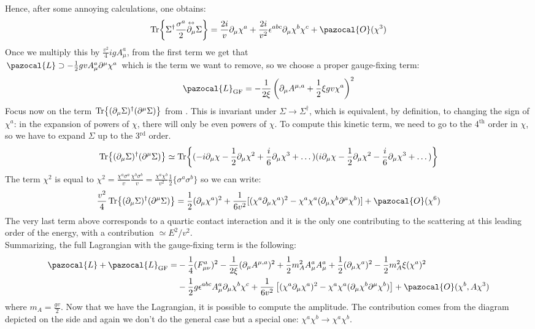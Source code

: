 \documentclass[../main.tex]{subfiles}
\begin{document}
Hence, after some annoying calculations, one obtains:
\[
\Tr{\Sigma^\dagger\frac{\sigma^a}{2}\overset{\leftrightarrow}{\partial_\mu}\Sigma}=\frac{2i}{v}\partial_\mu\chi^a+\frac{2i}{v^2}\epsilon^{abc}\partial_\mu\chi^b\chi^c+\pazocal{O}(\chi^3)
\]
Once we multiply this by $\frac{v^2}{4}igA_\mu^a$, from the first term we get that\\
$\pazocal{L}\supset-\frac{1}{2}gvA_\mu^a\partial^\mu\chi^a$ which is the term we want to remove, so we choose a proper gauge-fixing term:
\[
\pazocal{L}_{\text{GF}}=-\frac{1}{2\xi}\left(\partial_\mu A^{\mu,a}+\frac{1}{2}\xi gv\chi^a\right)^2
\]
Focus now on the term $\Tr{(\partial_\mu\Sigma)^\dagger(\partial^\mu\Sigma)}$ from . This is invariant under $\Sigma\to\Sigma^\dagger$, which is equivalent, by definition, to changing the sign of $\chi^a$: in the expansion of powers of $\chi$, there will only be even powers of $\chi$. To compute this kinetic term, we need to go to the 4$^\text{th}$ order in $\chi$, so we have to expand $\Sigma$ up to the 3$^\text{rd}$ order.
\[
\Tr{(\partial_\mu\Sigma)^\dagger(\partial^\mu\Sigma)}\simeq\Tr{(-i\partial_\mu\chi-\frac{1}{2}\partial_\mu\chi^2+\frac{i}{6}\partial_\mu\chi^3+\dots)(i\partial_\mu\chi-\frac{1}{2}\partial_\mu\chi^2-\frac{i}{6}\partial_\mu\chi^3+\dots)}
\]
The term $\chi^2$ is equal to $\chi^2=\frac{\chi^a\sigma^a}{v}\frac{\chi^b\sigma^b}{v}=\frac{\chi^a\chi^b}{v^2}\frac{1}{2}\{\sigma^a\sigma^b\}$ so we can write:
\[
\frac{v^2}{4}\Tr{(\partial_\mu\Sigma)^\dagger(\partial^\mu\Sigma)}=\frac{1}{2}(\partial_\mu\chi^a)^2+\frac{1}{6v^2}[(\chi^a\partial_\mu\chi^a)^2-\chi^a\chi^a(\partial_\mu\chi^b\partial^\mu\chi^b)]+\pazocal{O}(\chi^6)
\]
The very last term above corresponds to a quartic contact interaction and it is the only one contributing to the scattering at this leading order of the energy, with a contribution $\simeq E^2/v^2$.\\
Summarizing, the full Lagrangian with the gauge-fixing term is the following:
\begin{align*}
\pazocal{L}+\pazocal{L}_{\text{GF}}=&-\frac{1}{4}(F_{\mu\nu}^a)^2-\frac{1}{2\xi}(\partial_\mu A^{\mu,a})^2+\frac{1}{2}m_A^2A_\mu^aA_\mu^a+\frac{1}{2}(\partial_\mu\chi^a)^2-\frac{1}{2}m_A^2\xi(\chi^a)^2\\
&-\frac{1}{2}g\epsilon^{abc}A_\mu^a\partial_\mu\chi^b\chi^c+\frac{1}{6v^2}\left[(\chi^a\partial_\mu\chi^a)^2-\chi^a\chi^a(\partial_\mu\chi^b\partial^\mu\chi^b)\right]+\pazocal{O}(\chi^b,A\chi^3)
\end{align*}
where $m_A=\frac{gv}{2}$. Now that we have the Lagrangian, it is possible to compute the amplitude. The contribution comes from the diagram depicted on the side and again we don't do the general case but a special one: $\chi^a\chi^b\to\chi^a\chi^b$.
\end{document}
